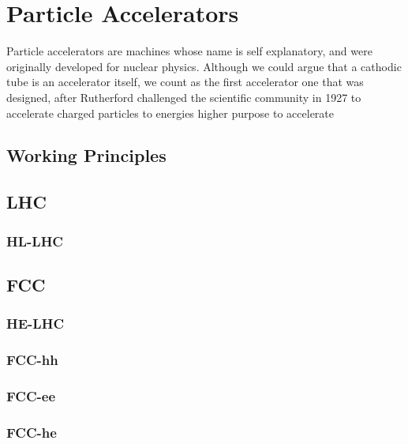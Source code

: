
\chapter{Particle Accelerators}
\label{c:accel} %
Particle accelerators are machines whose name is self explanatory, and were
originally developed for nuclear physics. Although we could argue that a
cathodic tube is an accelerator itself, we count as the first accelerator one
that was designed, after Rutherford challenged the scientific community in 1927
to accelerate charged particles to energies higher \cite{Steere2005timeline}   
purpose to accelerate 
\section{Working Principles}

\section{LHC}
\subsection{HL-LHC}
\section{FCC}
\subsection{HE-LHC}
\subsection{FCC-hh}
\subsection{FCC-ee}
\subsection{FCC-he}
